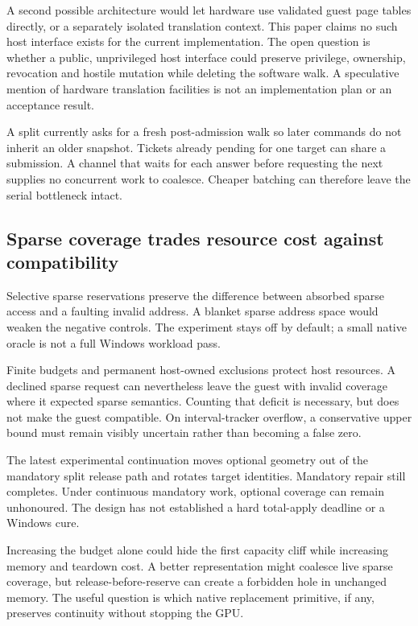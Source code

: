 A second possible architecture would let hardware use validated guest page tables directly,
or a separately isolated translation context. This paper claims no such host interface exists
for the current implementation. The open question is whether a public, unprivileged host
interface could preserve privilege, ownership, revocation and hostile mutation while deleting
the software walk. A speculative mention of hardware translation facilities is not an
implementation plan or an acceptance result.

\doc A split currently asks for a fresh post-admission walk so later commands do not inherit
an older snapshot. Tickets already pending for one target can share a submission. A channel
that waits for each answer before requesting the next supplies no concurrent work to coalesce.
Cheaper batching can therefore leave the serial bottleneck intact.

\subsection{Sparse coverage trades resource cost against compatibility}

\doc Selective sparse reservations preserve the difference between absorbed sparse access
and a faulting invalid address. A blanket sparse address space would weaken the negative
controls. The experiment stays off by default; a small native oracle is not a full Windows
workload pass.

\doc Finite budgets and permanent host-owned exclusions protect host resources. A declined
sparse request can nevertheless leave the guest with invalid coverage where it expected
sparse semantics. Counting that deficit is necessary, but does not make the guest compatible.
On interval-tracker overflow, a conservative upper bound must remain visibly uncertain rather
than becoming a false zero.

\doc The latest experimental continuation moves optional geometry out of the mandatory split
release path and rotates target identities. Mandatory repair still completes. Under continuous
mandatory work, optional coverage can remain unhonoured. The design has not established a
hard total-apply deadline or a Windows cure.

\inferred Increasing the budget alone could hide the first capacity cliff while increasing
memory and teardown cost. A better representation might coalesce live sparse coverage, but
release-before-reserve can create a forbidden hole in unchanged memory. The useful question
is which native replacement primitive, if any, preserves continuity without stopping the GPU.

